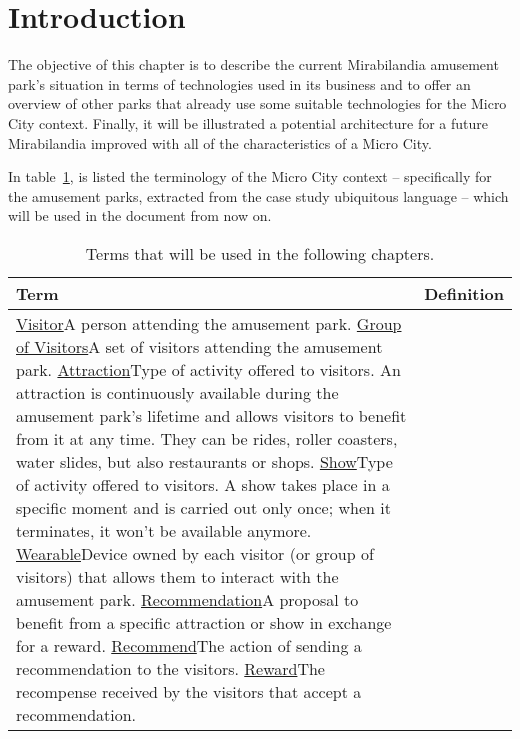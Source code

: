 \section*{Introduction}
\label{sec:introduction}

The objective of this chapter is to describe the current Mirabilandia amusement park's situation in terms of technologies used in its business and to offer an overview of other parks that already use some suitable technologies for the Micro City context.
Finally, it will be illustrated a potential architecture for a future Mirabilandia improved with all of the characteristics of a Micro City.

In table~\ref{tab:terms}, is listed the terminology of the Micro City context -- specifically for the amusement parks, extracted from the case study ubiquitous language -- which will be used in the document from now on.

\begin{longtable}{|l|p{}|}
	\hline
	\textbf{Term} & \textbf{Definition} \\
	\hline
	\ul{Visitor}{A person attending the amusement park.}
	\ul{Group of Visitors}{A set of visitors attending the amusement park.}
	\ul{Attraction}{Type of activity offered to visitors. An attraction is continuously available during the amusement park's lifetime and allows visitors to benefit from it at any time. They can be rides, roller coasters, water slides, but also restaurants or shops.}
	\ul{Show}{Type of activity offered to visitors. A show takes place in a specific moment and is carried out only once; when it terminates, it won't be available anymore.}
	\ul{Wearable}{Device owned by each visitor (or group of visitors) that allows them to interact with the amusement park.}
	\ul{Recommendation}{A proposal to benefit from a specific attraction or show in exchange for a reward.}
	\ul{Recommend}{The action of sending a recommendation to the visitors.}
	\ul{Reward}{The recompense received by the visitors that accept a recommendation.}
	\caption{Terms that will be used in the following chapters.}
	\label{tab:terms}
\end{longtable}